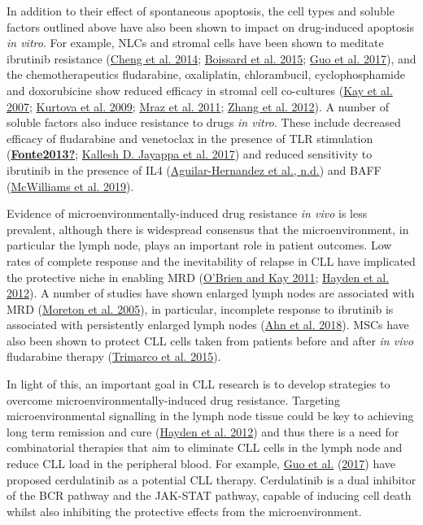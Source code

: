 \documentclass[11pt, a4paper, twosided]{book}
\begin{document}
In addition to their effect of spontaneous apoptosis, the cell types and soluble factors outlined above have also been shown to impact on drug-induced apoptosis \emph{in vitro}. For example, NLCs and stromal cells have been shown to meditate ibrutinib resistance (\protect\hyperlink{ref-Cheng2014}{Cheng et al. 2014}; \protect\hyperlink{ref-Boissard2015}{Boissard et al. 2015}; \protect\hyperlink{ref-Guo2017}{Guo et al. 2017}), and the chemotherapeutics fludarabine, oxaliplatin, chlorambucil, cyclophosphamide and doxorubicine show reduced efficacy in stromal cell co-cultures (\protect\hyperlink{ref-Kay2007}{Kay et al. 2007}; \protect\hyperlink{ref-Kurtova2009}{Kurtova et al. 2009}; \protect\hyperlink{ref-Mraz2011}{Mraz et al. 2011}; \protect\hyperlink{ref-Zhang2012}{Zhang et al. 2012}). A number of soluble factors also induce resistance to drugs \emph{in vitro}. These include decreased efficacy of fludarabine and venetoclax in the presence of TLR stimulation (\protect\hyperlink{ref-Fonte2013}{\textbf{Fonte2013?}}; \protect\hyperlink{ref-Jayappa2017}{Kallesh D. Jayappa et al. 2017}) and reduced sensitivity to ibrutinib in the presence of IL4 (\protect\hyperlink{ref-AguilarHernandez2016}{Aguilar-Hernandez et al., n.d.}) and BAFF (\protect\hyperlink{ref-McWilliams2019}{McWilliams et al. 2019}).

Evidence of microenvironmentally-induced drug resistance \emph{in vivo} is less prevalent, although there is widespread consensus that the microenvironment, in particular the lymph node, plays an important role in patient outcomes. Low rates of complete response and the inevitability of relapse in CLL have implicated the protective niche in enabling MRD (\protect\hyperlink{ref-OBrien2011}{O'Brien and Kay 2011}; \protect\hyperlink{ref-Hayden2012}{Hayden et al. 2012}). A number of studies have shown enlarged lymph nodes are associated with MRD (\protect\hyperlink{ref-Moreton2005}{Moreton et al. 2005}), in particular, incomplete response to ibrutinib is associated with persistently enlarged lymph nodes (\protect\hyperlink{ref-Ahn2018}{Ahn et al. 2018}). MSCs have also been shown to protect CLL cells taken from patients before and after \emph{in vivo} fludarabine therapy (\protect\hyperlink{ref-Trimarco2015}{Trimarco et al. 2015}).

In light of this, an important goal in CLL research is to develop strategies to overcome microenvironmentally-induced drug resistance. Targeting microenvironmental signalling in the lymph node tissue could be key to achieving long term remission and cure (\protect\hyperlink{ref-Hayden2012}{Hayden et al. 2012}) and thus there is a need for combinatorial therapies that aim to eliminate CLL cells in the lymph node and reduce CLL load in the peripheral blood. For example, \protect\hyperlink{ref-Guo2017}{Guo et al.} (\protect\hyperlink{ref-Guo2017}{2017}) have proposed cerdulatinib as a potential CLL therapy. Cerdulatinib is a dual inhibitor of the BCR pathway and the JAK-STAT pathway, capable of inducing cell death whilst also inhibiting the protective effects from the microenvironment.
\end{document}
